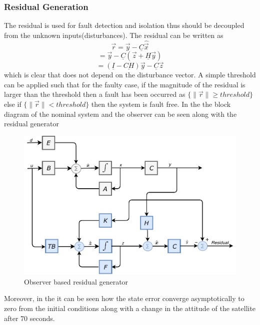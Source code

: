 \subsubsection{Residual Generation}
The residual is used for fault detection and isolation thus should be decoupled from the unknown inputs(disturbances). The residual can be written as
\begin{equation*}
\vec{r} = \vec{y} - \underline C \hat{\vec{x}} 
\label{errordynamics11}
\end{equation*}
\begin{equation*}
= \vec{y} - \underline C (\vec{z} + \underline{H} \vec{y} ) 
\label{errordynamics12}
\end{equation*}
\begin{equation*}
= (\underline I  -\underline{ CH})\vec{y}   -\underline C \vec{z} 
\label{errordynamics13}
\end{equation*}
which is clear that does not depend on the disturbance vector. A simple threshold can be applied such that for the faulty case, if the magnitude of the residual is larger than the threshold then a fault has been occurred as
$\{\lVert \vec{r}\rVert \geq threshold \}$ else if $\{\lVert \vec{r}\rVert < threshold \}$ then the system is fault free. In the  the block diagram of the nominal system and the observer can be seen along with the residual generator
\begin{figure}[H]
	\centering
	\includegraphics[width=0.8\linewidth]{figures/UIO}
	\caption{Observer based residual generator}
	\label{fig:residualobs}
\end{figure}
Moreover, in the  it can be seen how the state error converge asymptotically to zero from the initial conditions along with a change in the attitude of the satellite after 70 seconds.
